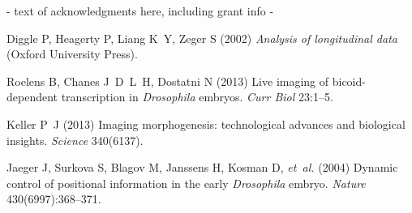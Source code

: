 \documentclass{pnastwo}
\begin{document}
\begin{article}
\begin{acknowledgments}
- text of acknowledgments here, including grant info -
\end{acknowledgments}






%
%

\begin{thebibliography}{10}

Diggle P, Heagerty P, Liang K~Y, Zeger S (2002) \textit{Analysis of
  longitudinal data} (Oxford University Press).

Roelens B, Chanes J~D~L~H, Dostatni N (2013) Live imaging of bicoid-dependent
  transcription in \textit{{D}rosophila} embryos. \textit{Curr Biol}
  23:1--5.

Keller P~J (2013) Imaging morphogenesis: technological advances and biological
  insights. \textit{Science} 340(6137).

Jaeger J, Surkova S, Blagov M, Janssens H, Kosman D, \textit{et~al.} (2004)
  Dynamic control of positional information in the early \textit{{D}rosophila}
  embryo. \textit{Nature} 430(6997):368--371.


\end{thebibliography}
\end{article}
\end{document}
